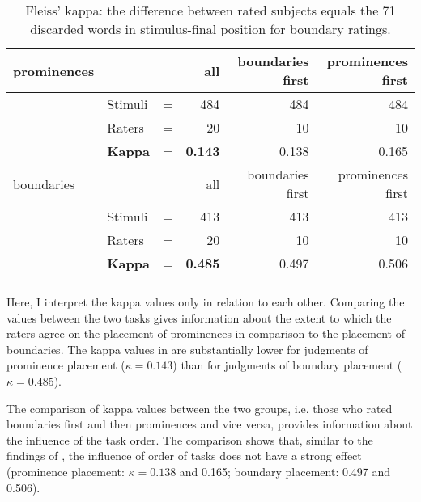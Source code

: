 \begin{table}
	\caption{Fleiss' kappa: the difference between rated subjects equals the 71 discarded words in stimulus-final position for boundary ratings.}
	\label{Fleiss' kappa scores and z-scores}
	\begin{tabular}{lll rrr}
		\lsptoprule
		prominences &&            & all   & boundaries first   & prominences first   \\
		\midrule
		& Stimuli &= & 484   & 484   & 484   \\
		& Raters &=   & 20    & 10    & 10    \\
		& \textbf{Kappa}& =    & \textbf{0.143} & 0.138 & 0.165 \\
		\midrule
		boundaries  &&            & all      & boundaries first  & prominences first \\
		\midrule
		& Stimuli  &= & 413     & 413   & 413 \\
		& Raters &=   & 20        & 10  & 10  \\
		& \textbf{Kappa} &=    & \textbf{0.485}  & 0.497& 0.506 \\
		\lspbottomrule
	\end{tabular}
\end{table}

Here, I interpret the kappa values only in relation to each other. 
Comparing the values between the two tasks gives information about the extent to which the raters agree on the placement of prominences in comparison to the placement of boundaries. The kappa values in   are substantially lower for judgments of prominence placement ($\kappa = 0.143$) than for judgments of boundary  placement ($\kappa = 0.485$). 

The comparison of kappa values between the two groups, i.e. those who rated boundaries first and then prominences and vice versa, provides information about the influence of the task order. The comparison shows that, similar to the findings of \citet[736]{mo2008naive}, the influence of order of tasks  does not have a strong effect (prominence placement: $\kappa = 0.138$ and 0.165; boundary placement: 0.497 and 0.506).  


